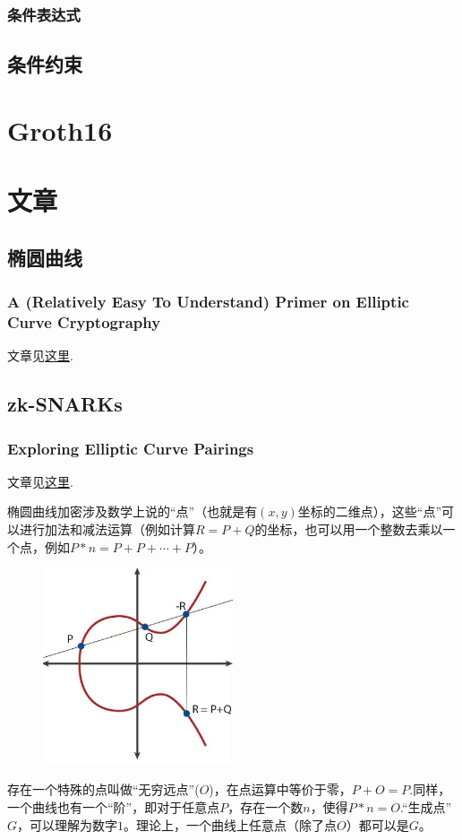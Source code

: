 \documentclass[10pt]{ctexart}
\begin{document}
\subsubsection{条件表达式}

\subsection{条件约束}

\section{Groth16}
\section{文章}
\subsection{椭圆曲线}
\subsubsection{A (Relatively Easy To Understand) Primer on Elliptic Curve Cryptography}
文章见\href{https://blog.cloudflare.com/a-relatively-easy-to-understand-primer-on-elliptic-curve-cryptography/}{这里}.
\subsection{zk-SNARKs}
\subsubsection{Exploring Elliptic Curve Pairings}
文章见\href{https://medium.com/@VitalikButerin/exploring-elliptic-curve-pairings-c73c1864e627}{这里}.

椭圆曲线加密涉及数学上说的“点”（也就是有$(x,y)$坐标的二维点），这些“点”可以进行加法和减法运算（例如计算$R=P+Q$的坐标，也可以用一个整数去乘以一个点，例如$P * n = P + P + \cdots + P$）。
\begin{figure}[H]
    \centering
    \includegraphics[width=0.5\textwidth]{./img/ExploringEllipticCurvePairings/EllipticCurve.png} 
\end{figure}
存在一个特殊的点叫做“无穷远点”($O$)，在点运算中等价于零，$P + O = P$.同样，一个曲线也有一个“阶”，即对于任意点$P$，存在一个数$n$，使得$P * n = O$.“生成点”$G$，可以理解为数字$1$。理论上，一个曲线上任意点（除了点$O$）都可以是$G$。
\end{document}
